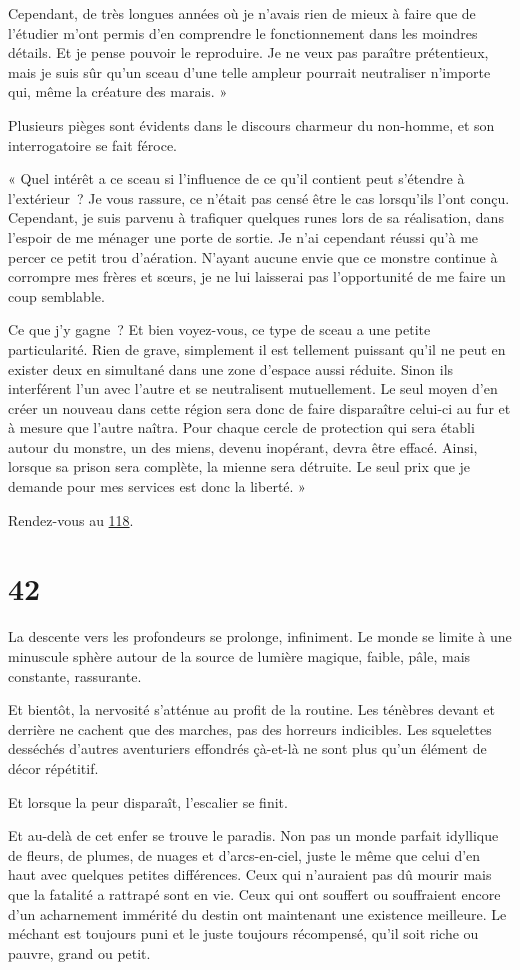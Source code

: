 \documentclass{report}
\newcommand{\gsection}[1]{
    \section{#1}
    \label{section-#1}
}
\newcommand{\glink}[1]{\hyperref[section-#1]{#1}}
\begin{document}
Cependant, de très longues années où je n'avais rien de mieux à faire que de l'étudier m'ont permis d'en comprendre le fonctionnement dans les moindres détails. Et je pense pouvoir le reproduire. Je ne veux pas paraître prétentieux, mais je suis sûr qu'un sceau d'une telle ampleur pourrait neutraliser n'importe qui, même la créature des marais. »

Plusieurs pièges sont évidents dans le discours charmeur du non-homme, et son interrogatoire se fait féroce.

« Quel intérêt a ce sceau si l'influence de ce qu'il contient peut s'étendre à l'extérieur ? Je vous rassure, ce n'était pas censé être le cas lorsqu'ils l'ont conçu. Cependant, je suis parvenu à trafiquer quelques runes lors de sa réalisation, dans l'espoir de me ménager une porte de sortie. Je n'ai cependant réussi qu'à me percer ce petit trou d'aération. N'ayant aucune envie que ce monstre continue à corrompre mes frères et sœurs, je ne lui laisserai pas l'opportunité de me faire un coup semblable.

Ce que j'y gagne ? Et bien voyez-vous, ce type de sceau a une petite particularité. Rien de grave, simplement il est tellement puissant qu'il ne peut en exister deux en simultané dans une zone d'espace aussi réduite. Sinon ils interférent l'un avec l'autre et se neutralisent mutuellement. Le seul moyen d'en créer un nouveau dans cette région sera donc de faire disparaître celui-ci au fur et à mesure que l'autre naîtra. Pour chaque cercle de protection qui sera établi autour du monstre, un des miens, devenu inopérant, devra être effacé. Ainsi, lorsque sa prison sera complète, la mienne sera détruite. Le seul prix que je demande pour mes services est donc la liberté. »

Rendez-vous au \glink{118}.

\gsection{42}

La descente vers les profondeurs se prolonge, infiniment. Le monde se limite à une minuscule sphère autour de la source de lumière magique, faible, pâle, mais constante, rassurante.

Et bientôt, la nervosité s'atténue au profit de la routine. Les ténèbres devant et derrière ne cachent que des marches, pas des horreurs indicibles. Les squelettes desséchés d'autres aventuriers effondrés çà-et-là ne sont plus qu'un élément de décor répétitif.

Et lorsque la peur disparaît, l'escalier se finit.

Et au-delà de cet enfer se trouve le paradis. Non pas un monde parfait idyllique de fleurs, de plumes, de nuages et d'arcs-en-ciel, juste le même que celui d'en haut avec quelques petites différences. Ceux qui n'auraient pas dû mourir mais que la fatalité a rattrapé sont en vie. Ceux qui ont souffert ou souffraient encore d'un acharnement immérité du destin ont maintenant une existence meilleure. Le méchant est toujours puni et le juste toujours récompensé, qu'il soit riche ou pauvre, grand ou petit.
\end{document}
